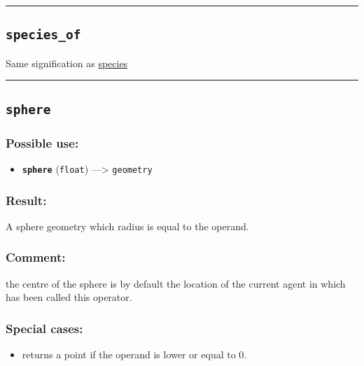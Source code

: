 \documentclass[]{book}
\providecommand{\tightlist}{%
  \setlength{\itemsep}{0pt}\setlength{\parskip}{0pt}}
\theoremstyle{definition}
\theoremstyle{definition}
\theoremstyle{definition}
\theoremstyle{remark}
\begin{document}
\begin{center}\rule{0.5\linewidth}{\linethickness}\end{center}

\subsection{\texorpdfstring{\texttt{species\_of}}{species\_of}}\label{species_of}

Same signification as \href{OperatorsSZ\#species}{species}

\begin{center}\rule{0.5\linewidth}{\linethickness}\end{center}

\subsection{\texorpdfstring{\texttt{sphere}}{sphere}}\label{sphere}

\subsubsection{Possible use:}\label{possible-use-490}

\begin{itemize}
\tightlist
\item
  \textbf{\texttt{sphere}} (\texttt{float}) ---\textgreater{}
  \texttt{geometry}
\end{itemize}

\subsubsection{Result:}\label{result-474}

A sphere geometry which radius is equal to the operand.

\subsubsection{Comment:}\label{comment-90}

the centre of the sphere is by default the location of the current agent
in which has been called this operator.

\subsubsection{Special cases:}\label{special-cases-127}

\begin{itemize}
\tightlist
\item
  returns a point if the operand is lower or equal to 0.
\end{itemize}
\end{document}
